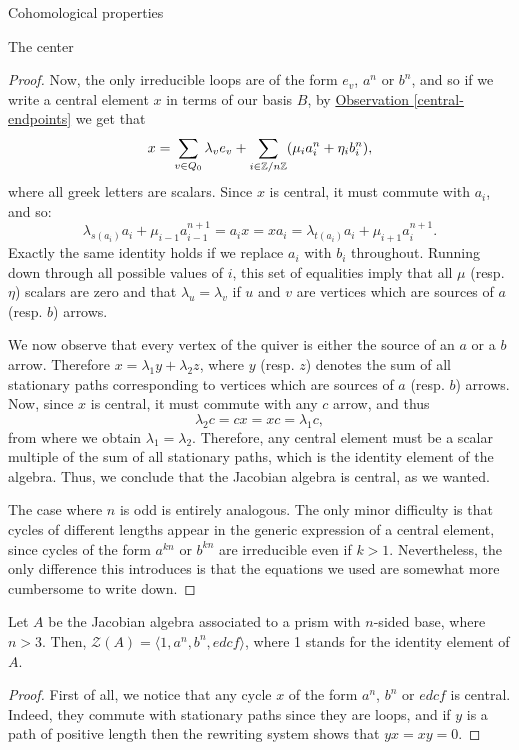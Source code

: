 \begin{chapter}{Cohomological properties}
\begin{section}{The center}
\begin{proof}
Now, the only irreducible loops are of the form $e_v$, $a^n$ or $b^n$, and so if we write a central element $x$ in terms of our basis $B$, by \hyperref[central-endpoints]{Observation \ref*{central-endpoints}} we get that
\[x = \sum_{v\in Q_0} \lambda_v e_v + \sum_{i\in \mathbb{Z}/n\mathbb{Z}}(\mu_i a_i^n + \eta_i b_i^n),\]
where all greek letters are scalars. Since $x$ is central, it must commute with $a_i$, and so:
\[\lambda_{s(a_i)}a_i + \mu_{i-1} a_{i-1}^{n+1}=a_ix = xa_i = \lambda_{t(a_i)}a_i + \mu_{i+1} a_i^{n+1}.\]
Exactly the same identity holds if we replace $a_i$ with $b_i$ throughout. Running down through all possible values of $i$, this set of equalities imply that all $\mu$ (resp. $\eta$) scalars are zero and that $\lambda_u=\lambda_v$ if $u$ and $v$ are vertices which are sources of $a$ (resp. $b$) arrows.

We now observe that every vertex of the quiver is either the source of an $a$ or a $b$ arrow. Therefore $x=\lambda_1 y + \lambda_2 z$, where $y$ (resp. $z$) denotes the sum of all stationary paths corresponding to vertices which are sources of $a$ (resp. $b$) arrows. Now, since $x$ is central, it must commute with any $c$ arrow, and thus
\[\lambda_2 c = cx = xc = \lambda_1 c,\]
from where we obtain $\lambda_1=\lambda_2$. Therefore, any central element must be a scalar multiple of the sum of all stationary paths, which is the identity element of the algebra. Thus, we conclude that the Jacobian algebra is central, as we wanted.

The case where $n$ is odd is entirely analogous. The only minor difficulty is that cycles of different lengths appear in the generic expression of a central element, since cycles of the form $a^{kn}$ or $b^{kn}$ are irreducible even if $k>1$. Nevertheless, the only difference this introduces is that the equations we used are somewhat more cumbersome to write down.
\end{proof}

\begin{prop} Let $A$ be the Jacobian algebra associated to a prism with $n$-sided base, where $n>3$. Then, $\mathcal{Z}(A) = \langle 1, a^n, b^n, edcf\rangle$, where 1 stands for the identity element of $A$.
\end{prop}
\begin{proof} First of all, we notice that any cycle $x$ of the form $a^n$, $b^n$ or $edcf$ is central. Indeed, they commute with stationary paths since they are loops, and if $y$ is a path of positive length then the rewriting system shows that $yx=xy=0$.


\end{proof}
\end{section}
\end{chapter}
